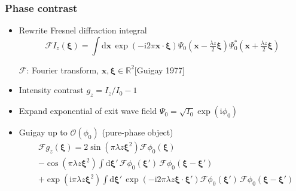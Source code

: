 \documentclass{beamer}
\renewcommand{\vec}{\mathbold}
\newcommand{\vecx}{\vec{x}}
\newcommand{\vecxi}{\vec{\xi}}
\newcommand{\order}{\mathcal{O}}
\newcommand{\R}{\mathbb{R}}
\newcommand{\ii}{\mathrm{i}}
\newcommand{\F}{\mathcal{F}}
\newcommand{\ft}[1]{\widehat{#1}}
\newcommand{\Intd}[1]{\!\mathrm{d}#1\,}
\newcommand{\expp}[1]{\exp\left(#1\right)}
\newcommand{\flr}[1]{\begin{flushright}{#1}\end{flushright}}
\begin{document}
\begin{frame}
  \frametitle{Phase contrast}
  \begin{itemize}
  \item Rewrite Fresnel diffraction integral
    \begin{equation*}
    \F I_z(\vecxi) = 
    \int \Intd{\vecx}\exp{(-\ii 2\pi\vecx\cdot\vecxi)} 
    \Psi_0\left(\vecx-\tfrac{\lambda z}{2}\vecxi\right) 
    \Psi^*_0\left(\vecx+\tfrac{\lambda z}{2}\vecxi\right)
  \end{equation*}
  \flr{\small{$\F$: Fourier transform, $\vecx,\vecxi \in \R^2$\quad}\scriptsize{[Guigay 1977]}}
\item Intensity contrast $g_z=I_z/I_0-1$
  \item Expand exponential of exit wave field
    $\Psi_0=\sqrt{I_0}\expp{\ii\phi_0}$ 
  \item Guigay up to $\order(\phi_0)$ (pure-phase object)
    \begin{equation*}
      \begin{split}
        &\F g_z(\vecxi) =
        2\sin(\pi\lambda z\vecxi^2)\F \phi_0(\vecxi) 
        \\ & -\cos(\pi\lambda z\vecxi^2)\int\Intd{\vecxi'}
        \F\phi_0(\vecxi')\,\F\phi_0(\vecxi-\vecxi')
        \\ & +\expp{\ii\pi\lambda z\vecxi^2}\int\Intd{\vecxi'}
        \expp{-\ii 2\pi\lambda z\vecxi\cdot\vecxi'} 
        \F\phi_0(\vecxi')\,\F\phi_0(\vecxi-\vecxi')
      \end{split}
    \end{equation*}
  \end{itemize}
\end{frame}
\end{document}
